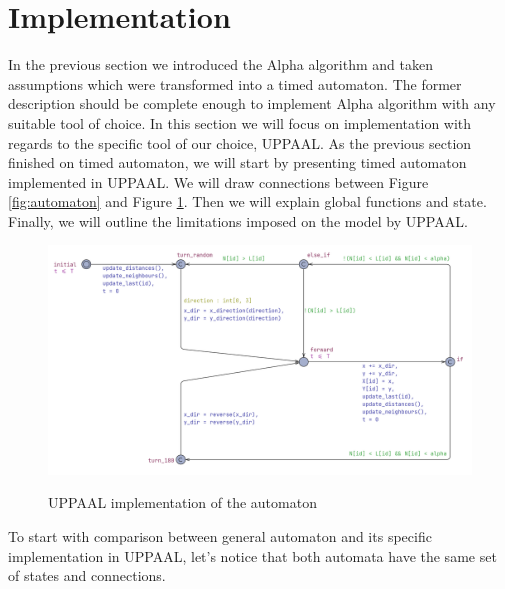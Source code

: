 \section{Implementation}
In the previous section we introduced the Alpha algorithm and taken assumptions which were transformed into a timed automaton. The former description should be complete enough to implement Alpha algorithm with any suitable tool of choice. In this section we will focus on implementation with regards to the specific tool of our choice, UPPAAL. As the previous section finished on timed automaton, we will start by presenting timed automaton implemented in UPPAAL. We will draw connections between Figure \ref{fig:automaton} and Figure \ref{fig:automaton_uppaal}. Then we will explain global functions and state. Finally, we will outline the limitations imposed on the model by UPPAAL.

\begin{figure}[H]
\caption{UPPAAL implementation of the automaton}
\includegraphics[scale=0.3]{images/automaton_uppaal.png}
\label{fig:automaton_uppaal}
\end{figure}

To start with comparison between general automaton and its specific implementation in UPPAAL, let's notice that both automata have the same set of states and connections. 
